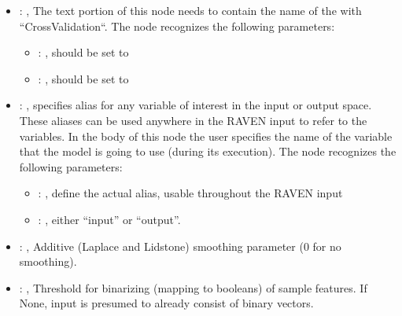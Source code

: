 \begin{itemize}
\begin{itemize}
        \item {}: ,
          List of IDs of features/variables to include in the transformation process.

        \item {}: ,
          Which space to search? Target or Feature?
      \end{itemize}

    \item {}: ,
      The text portion of this node needs to contain the name of the  with
               ``CrossValidation``.
      The  node recognizes the following parameters:
        \begin{itemize}
          \item {}: ,
            should be set to 
          \item {}: ,
            should be set to 
      \end{itemize}

    \item {}: ,
      specifies alias for         any variable of interest in the input or output space. These
      aliases can be used anywhere in the RAVEN input to         refer to the variables. In the body
      of this node the user specifies the name of the variable that the model is going to use
      (during its execution).
      The  node recognizes the following parameters:
        \begin{itemize}
          \item {}: ,
            define the actual alias, usable throughout the RAVEN input
          \item {}: ,
            either ``input'' or ``output''.
      \end{itemize}

    \item {}: ,
      Additive (Laplace and Lidstone) smoothing parameter (0 for no smoothing).

    \item {}: ,
      Threshold for binarizing (mapping to booleans) of sample features. If None,
      input is presumed to already consist of binary vectors.


\end{itemize}
